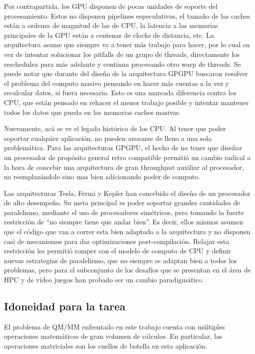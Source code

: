 Por contrapartida, los GPU disponen de pocas unidades de soporte del procesamiento. Estos no disponen pipelines
especulativos, el tama\~no de las caches est\'an a ordenes de magnitud de las de CPU, la latencia a las memorias
principales de la GPU est\'an a centenas de clocks de distancia, etc. La arquitectura asume que siempre va a tener m\'as trabajo
para hacer, por lo cual en vez de intentar solucionar los pitfalls de un grupo de threads, directamente
los reschedulea para m\'as adelante y continua procesando otro warp de threads. Se puede notar que durante del
dise\~no de la arquitectura GPGPU buscaron resolver el problema del computo masivo pensando en hacer
m\'as cuentas a la vez y recalcular datos, si fuera necesario. Esto es una marcada diferencia contra
los CPU, que est\'an pensado en rehacer el menor trabajo posible y intentar mantener todos los datos que pueda en
las memorias caches masivas.

Nuevamente, ac\'a se ve el legado hist\'orico de los CPU. Al tener que poder soportar cualquier aplicaci\'on, no pueden
avocarse de lleno a una sola problem\'atica. Para las arquitecturas GPGPU, el hecho de no tener que dise\~nar un
procesador de prop\'osito general retro compatible permiti\'o un cambio radical a la hora de concebir
una arquitectura de gran throughput auxiliar al procesador, no reemplaz\'andolo sino mas bien adicionando poder de computo.~\cite{GlaskowskyFermi}

Las arquitecturas Tesla, Fermi y Kepler han concebido el dise\~no de un procesador de alto desempe\~no.
Su meta principal es poder soportar grandes cantidades de paralelismo, mediante el uso de procesadores
sim\'etricos, pero tomando la fuerte restricci\'on de ``no siempre tiene que andar bien''. Es decir, ellos
mismos asumen que el c\'odigo que van a correr esta bien adaptado a la arquitectura y no disponen
casi de mecanismos para dar optimizaciones post-compilaci\'on. Relajar esta restricci\'on
les permiti\'o romper con el modelo de computo de CPU y definir nuevas estrategias de paralelismo,
que no siempre se adaptan bien a todos los problemas, pero para el subconjunto de los desaf\'ios que se
presentan en el \'area de HPC y de v\'ideo juegos han probado ser un cambio paradigm\'atico.

\subsection{Idoneidad para la tarea}
El problema de QM/MM enfrentado en este trabajo cuenta con m\'ultiples operaciones matem\'aticas de gran
volumen de c\'alculos. En particular, las operaciones matriciales son los cuellos de botella en esta aplicaci\'on.


